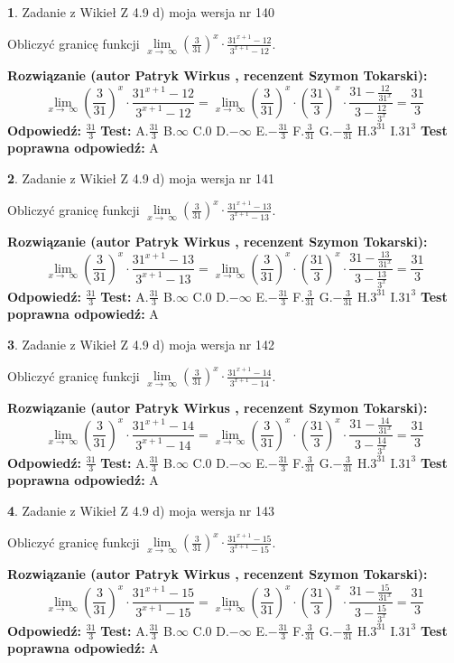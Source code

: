 \documentclass[12pt, a4paper]{article}
\theoremstyle{definition} %
\newtheorem{zad}{}
\newcommand{\zadStart}[1]{\begin{zad}#1\newline}
\newcommand{\zadStop}{\end{zad}}
\newcommand{\rozwStart}[2]{\noindent \textbf{Rozwiązanie (autor #1 , recenzent #2): }\newline}
\newcommand{\rozwStop}{\newline}
\newcommand{\odpStart}{\noindent \textbf{Odpowiedź:}\newline}
\newcommand{\odpStop}{\newline}
\newcommand{\testStart}{\noindent \textbf{Test:}\newline}
\newcommand{\testStop}{\newline}
\newcommand{\kluczStart}{\noindent \textbf{Test poprawna odpowiedź:}\newline}
\newcommand{\kluczStop}{\newline}
\begin{document}
\zadStart{Zadanie z Wikieł Z 4.9 d) moja wersja nr 140}


Obliczyć granicę funkcji  $\lim\limits_{x\to\ \infty}(\frac{3}{31})^{x}\cdot\frac{31^{x+1}-12}{3^{x+1}-12}$.
\zadStop
\rozwStart{Patryk Wirkus}{Szymon Tokarski}
$$\lim\limits_{x\to\ \infty}(\frac{3}{31})^{x}\cdot\frac{31^{x+1}-12}{3^{x+1}-12}=\lim\limits_{x\to\ \infty}(\frac{3}{31})^{x}\cdot(\frac{31}{3})^{x} \cdot \frac{31-\frac{12}{31^{x}}}{3-\frac{12}{3^{x}}} = \frac{31}{3}$$
\rozwStop
\odpStart
$\frac{31}{3}$
\odpStop
\testStart
A.$\frac{31}{3}$ B.$\infty$ C.$0$ D.$-\infty$ E.$-\frac{31}{3}$
F.$\frac{3}{31}$ G.$-\frac{3}{31}$
H.$3^{31}$
I.$31^{3}$
\testStop
\kluczStart
A
\kluczStop



\zadStart{Zadanie z Wikieł Z 4.9 d) moja wersja nr 141}


Obliczyć granicę funkcji  $\lim\limits_{x\to\ \infty}(\frac{3}{31})^{x}\cdot\frac{31^{x+1}-13}{3^{x+1}-13}$.
\zadStop
\rozwStart{Patryk Wirkus}{Szymon Tokarski}
$$\lim\limits_{x\to\ \infty}(\frac{3}{31})^{x}\cdot\frac{31^{x+1}-13}{3^{x+1}-13}=\lim\limits_{x\to\ \infty}(\frac{3}{31})^{x}\cdot(\frac{31}{3})^{x} \cdot \frac{31-\frac{13}{31^{x}}}{3-\frac{13}{3^{x}}} = \frac{31}{3}$$
\rozwStop
\odpStart
$\frac{31}{3}$
\odpStop
\testStart
A.$\frac{31}{3}$ B.$\infty$ C.$0$ D.$-\infty$ E.$-\frac{31}{3}$
F.$\frac{3}{31}$ G.$-\frac{3}{31}$
H.$3^{31}$
I.$31^{3}$
\testStop
\kluczStart
A
\kluczStop



\zadStart{Zadanie z Wikieł Z 4.9 d) moja wersja nr 142}


Obliczyć granicę funkcji  $\lim\limits_{x\to\ \infty}(\frac{3}{31})^{x}\cdot\frac{31^{x+1}-14}{3^{x+1}-14}$.
\zadStop
\rozwStart{Patryk Wirkus}{Szymon Tokarski}
$$\lim\limits_{x\to\ \infty}(\frac{3}{31})^{x}\cdot\frac{31^{x+1}-14}{3^{x+1}-14}=\lim\limits_{x\to\ \infty}(\frac{3}{31})^{x}\cdot(\frac{31}{3})^{x} \cdot \frac{31-\frac{14}{31^{x}}}{3-\frac{14}{3^{x}}} = \frac{31}{3}$$
\rozwStop
\odpStart
$\frac{31}{3}$
\odpStop
\testStart
A.$\frac{31}{3}$ B.$\infty$ C.$0$ D.$-\infty$ E.$-\frac{31}{3}$
F.$\frac{3}{31}$ G.$-\frac{3}{31}$
H.$3^{31}$
I.$31^{3}$
\testStop
\kluczStart
A
\kluczStop



\zadStart{Zadanie z Wikieł Z 4.9 d) moja wersja nr 143}


Obliczyć granicę funkcji  $\lim\limits_{x\to\ \infty}(\frac{3}{31})^{x}\cdot\frac{31^{x+1}-15}{3^{x+1}-15}$.
\zadStop
\rozwStart{Patryk Wirkus}{Szymon Tokarski}
$$\lim\limits_{x\to\ \infty}(\frac{3}{31})^{x}\cdot\frac{31^{x+1}-15}{3^{x+1}-15}=\lim\limits_{x\to\ \infty}(\frac{3}{31})^{x}\cdot(\frac{31}{3})^{x} \cdot \frac{31-\frac{15}{31^{x}}}{3-\frac{15}{3^{x}}} = \frac{31}{3}$$
\rozwStop
\odpStart
$\frac{31}{3}$
\odpStop
\testStart
A.$\frac{31}{3}$ B.$\infty$ C.$0$ D.$-\infty$ E.$-\frac{31}{3}$
F.$\frac{3}{31}$ G.$-\frac{3}{31}$
H.$3^{31}$
I.$31^{3}$
\testStop
\kluczStart
A
\kluczStop
\end{document}

